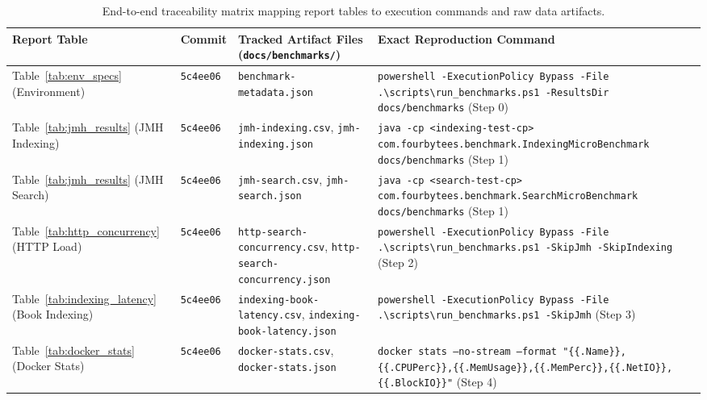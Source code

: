 \documentclass[10pt,a4paper]{article}
\begin{document}
\begin{table}[!htbp]
\centering
\caption{End-to-end traceability matrix mapping report tables to execution commands and raw data artifacts.}
\label{tab:traceability}
\scriptsize
\setlength{\tabcolsep}{3.5pt}
\renewcommand{\arraystretch}{1.16}
\begin{tabularx}{\textwidth}{L{3.0cm} C{1.3cm} L{3.8cm} Y}
\toprule
\textbf{Report Table} & \textbf{Commit} & \textbf{Tracked Artifact Files (\texttt{docs/benchmarks/})} & \textbf{Exact Reproduction Command} \\
\midrule
Table~\ref{tab:env_specs} (Environment) & \texttt{5c4ee06} & \texttt{benchmark-metadata.json} & \texttt{powershell -ExecutionPolicy Bypass -File .\textbackslash scripts\textbackslash run\_benchmarks.ps1 -ResultsDir docs/benchmarks} (Step 0) \\
Table~\ref{tab:jmh_results} (JMH Indexing) & \texttt{5c4ee06} & \texttt{jmh-indexing.csv}, \texttt{jmh-indexing.json} & \texttt{java -cp <indexing-test-cp> com.fourbytees.benchmark.IndexingMicroBenchmark docs/benchmarks} (Step 1) \\
Table~\ref{tab:jmh_results} (JMH Search) & \texttt{5c4ee06} & \texttt{jmh-search.csv}, \texttt{jmh-search.json} & \texttt{java -cp <search-test-cp> com.fourbytees.benchmark.SearchMicroBenchmark docs/benchmarks} (Step 1) \\
Table~\ref{tab:http_concurrency} (HTTP Load) & \texttt{5c4ee06} & \texttt{http-search-concurrency.csv}, \texttt{http-search-concurrency.json} & \texttt{powershell -ExecutionPolicy Bypass -File .\textbackslash scripts\textbackslash run\_benchmarks.ps1 -SkipJmh -SkipIndexing} (Step 2) \\
Table~\ref{tab:indexing_latency} (Book Indexing) & \texttt{5c4ee06} & \texttt{indexing-book-latency.csv}, \texttt{indexing-book-latency.json} & \texttt{powershell -ExecutionPolicy Bypass -File .\textbackslash scripts\textbackslash run\_benchmarks.ps1 -SkipJmh} (Step 3) \\
Table~\ref{tab:docker_stats} (Docker Stats) & \texttt{5c4ee06} & \texttt{docker-stats.csv}, \texttt{docker-stats.json} & \texttt{docker stats --no-stream --format "\{\{.Name\}\},\{\{.CPUPerc\}\},\{\{.MemUsage\}\},\{\{.MemPerc\}\},\{\{.NetIO\}\},\{\{.BlockIO\}\}"} (Step 4) \\
\bottomrule
\end{tabularx}
\end{table}

\end{document}
